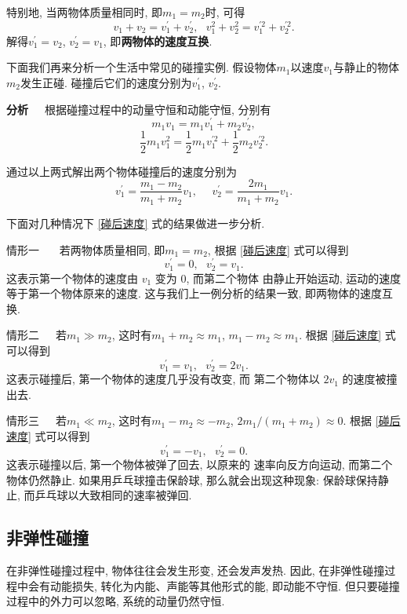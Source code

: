 \documentclass[11pt,a4paper]{ctexbook}
\newcommand{\bre}{\ \ \ }
\begin{document}
特别地, 当两物体质量相同时, 即$m_1 = m_2$时, 可得$$v_1 + v_2 = v_1^{\prime}+ v_2^{\prime},\bre v_1^2 + v_2^2 = v_1^{\prime 2}+ v_2^{\prime 2}.$$
解得$v_1^{\prime} = v_2$, $v_2^{\prime} = v_1$, 即\textbf{两物体的速度互换}.
\bigskip

下面我们再来分析一个生活中常见的碰撞实例. 假设物体$m_1$以速度$v_1$与静止的物体$m_2$发生正碰.
碰撞后它们的速度分别为$v_1^{\prime}$, $v_2^{\prime}$.

\textbf{分析}\bre 根据碰撞过程中的动量守恒和动能守恒, 分别有
$$m_1v_1 = m_1v_1^{\prime} + m_2v_2^{\prime}, $$
$$\displaystyle\frac12 m_1 v_1^2= \displaystyle\frac12 m_1 v_1^{\prime 2} + \displaystyle\frac12 m_2 v_2^{\prime 2}.$$

通过以上两式解出两个物体碰撞后的速度分别为
\begin{equation}
    v_1^{\prime} = \frac{m_1-m_2}{m_1+m_2}v_1,\bre\bre v_2^{\prime} = \frac{2m_1}{m_1+m_2}v_1.
    \label{碰后速度}
\end{equation}

下面对几种情况下 \eqref{碰后速度} 式的结果做进一步分析.

{\kaishu 情形一} \bre 若两物体质量相同, 即$m_1 = m_2$,
根据 \eqref{碰后速度} 式可以得到$$v_1^{\prime} = 0, \bre v_2^{\prime} = v_1.$$
这表示第一个物体的速度由 $v_1$ 变为 0, 而第二个物体
由静止开始运动, 运动的速度等于第一个物体原来的速度.
这与我们上一例分析的结果一致, 即两物体的速度互换.

{\kaishu 情形二}\bre 若$m_1 \gg m_2$, 这时有$m_1+m_2\approx m_1$, $m_1-m_2\approx m_1.$
根据 \eqref{碰后速度} 式可以得到$$v_1^{\prime} = v_1, \bre v_2^{\prime} = 2v_1.$$
这表示碰撞后, 第一个物体的速度几乎没有改变, 而
第二个物体以 $2v_1$ 的速度被撞出去.

{\kaishu 情形三}\bre 若$m_1 \ll m_2$, 这时有$m_1-m_2\approx -m_2$, $2m_1/(m_1+m_2)\approx 0.$
根据 \eqref{碰后速度} 式可以得到$$v_1^{\prime} = -v_1, \bre v_2^{\prime} = 0.$$
这表示碰撞以后, 第一个物体被弹了回去, 以原来的
速率向反方向运动, 而第二个物体仍然静止. 如果用乒乓球撞击保龄球,
那么就会出现这种现象: 保龄球保持静止, 而乒乓球以大致相同的速率被弹回.

\subsection{非弹性碰撞}

在非弹性碰撞过程中, 物体往往会发生形变, 还会发声发热.
因此, 在非弹性碰撞过程中会有动能损失, 转化为内能、声能等其他形式的能, 即动能不守恒.
但只要碰撞过程中的外力可以忽略, 系统的动量仍然守恒.
\end{document}
